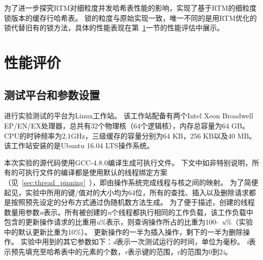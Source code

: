 为了进一步探究RTM对细粒度并发哈希表性能的影响，实现了基于RTM的细粒度锁版本的缓存行哈希表。
锁的粒度与原始实现一致，唯一不同的是用RTM优化的锁代替旧有的锁方法，具体的性能表现在第~\ref{sec:rtm-eva}一节的性能评估中展示。


\section{性能评价}
\label{sec:rtm-eva}
\subsection{测试平台和参数设置}
进行实验测试的平台为Linux工作站。
该工作站配备有两个Intel Xeon Broadwell EP/EN/EX处理器，总共有32个物理核（64个逻辑核），内存总容量为64 GB。
CPU的时钟频率为2.1GHz，三级缓存的容量分别为64 KB，256 KB以及40 MB。
该工作站安装的是Ubuntu 16.04 LTS操作系统。

本次实验的源代码使用GCC-4.8.0编译生成可执行文件。
下文中如非特别说明，所有的可执行文件的编译都是使用默认的线程绑定方案（见~\ref{sec:thread_pinning}~），即由操作系统完成线程与核之间的映射。
为了简便起见，实验中所用的键/值对的大小均为64位，所有的查找、插入以及删除请求都是按照预先设定的分布方式通过伪随机数方法生成。
为了便于描述，创建的线程数量用参数\textit{n}表示。所有被创建的\textit{n}个线程都执行相同的工作负载，该工作负载中包含的更新操作请求的比重用\textit{u}\%表示，则查询操作所占的比重为100-~\textit{u}\%（实验中的默认更新比重为10\%）。
更新操作的一半为插入操作，剩下的一半为删除操作。
实验中用到的其它参数如下：\textit{d}表示一次测试运行的时间，单位为毫秒。
\textit{i}表示预先填充至哈希表中的元素的个数，\textit{r}表示键的范围，r的范围为0到2\textit{i}。

